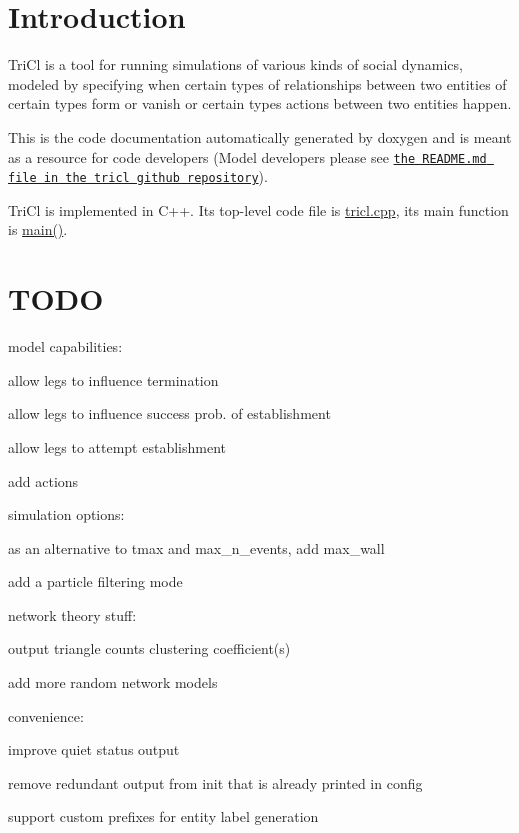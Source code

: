 \section*{Introduction }

Tri\+Cl is a tool for running simulations of various kinds of social dynamics, modeled by specifying when certain types of relationships between two entities of certain types form or vanish or certain types actions between two entities happen.

This is the code documentation automatically generated by doxygen and is meant as a resource for code developers (Model developers please see \href{https://github.com/mensch72/tricl}{\tt the R\+E\+A\+D\+M\+E.\+md file in the tricl github repository}).

Tri\+Cl is implemented in C++. Its top-\/level code file is \hyperlink{tricl_8cpp}{tricl.\+cpp}, its main function is \hyperlink{tricl_8cpp_a0ddf1224851353fc92bfbff6f499fa97}{main()}.

\section*{T\+O\+DO }

model capabilities\+:
\begin{DoxyItemize}
\item allow legs to influence termination
\item allow legs to influence success prob. of establishment
\item allow legs to attempt establishment
\item add actions
\end{DoxyItemize}

simulation options\+:
\begin{DoxyItemize}
\item as an alternative to tmax and max\+\_\+n\+\_\+events, add max\+\_\+wall
\item add a particle filtering mode
\end{DoxyItemize}

network theory stuff\+:
\begin{DoxyItemize}
\item output triangle counts clustering coefficient(s)
\item add more random network models
\end{DoxyItemize}

convenience\+:
\begin{DoxyItemize}
\item improve quiet status output
\item remove redundant output from init that is already printed in config
\item support custom prefixes for entity label generation
\end{DoxyItemize}

